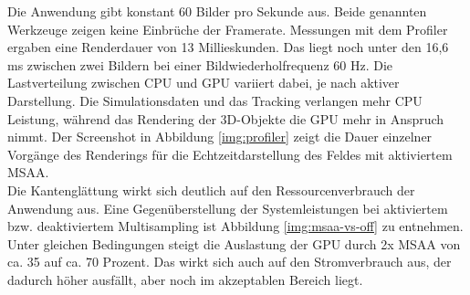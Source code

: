 Die Anwendung gibt konstant 60 Bilder pro Sekunde aus. Beide genannten Werkzeuge zeigen keine Einbrüche der Framerate. Messungen mit dem Profiler ergaben eine Renderdauer von 13 Millieskunden. Das liegt noch unter den 16,6 ms zwischen zwei Bildern bei einer Bildwiederholfrequenz 60 Hz. Die Lastverteilung zwischen CPU und GPU variiert dabei, je nach aktiver Darstellung. Die Simulationsdaten und das Tracking verlangen mehr CPU Leistung, während das Rendering der 3D-Objekte die GPU mehr in Anspruch nimmt. Der Screenshot in Abbildung \ref{img:profiler} zeigt die Dauer einzelner Vorgänge des Renderings für die Echtzeitdarstellung des Feldes mit aktiviertem MSAA.\\

Die Kantenglättung wirkt sich deutlich auf den Ressourcenverbrauch der Anwendung aus. Eine Gegenüberstellung der Systemleistungen bei aktiviertem bzw. deaktiviertem Multisampling ist Abbildung \ref{img:msaa-vs-off} zu entnehmen. Unter gleichen Bedingungen steigt die Auslastung der GPU durch 2x MSAA von ca. 35 auf ca. 70 Prozent. Das wirkt sich auch auf den Stromverbrauch aus, der dadurch höher ausfällt, aber noch im akzeptablen Bereich liegt.\\

